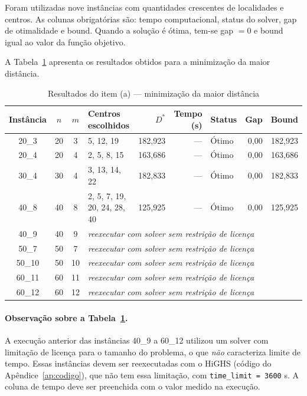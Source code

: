 \documentclass[12pt,a4paper]{article}
\begin{document}
Foram utilizadas nove instâncias com quantidades crescentes
de localidades e centros. As colunas obrigatórias são:
tempo computacional, status do solver, gap de otimalidade e
bound. Quando a solução é ótima, tem-se gap $=0$ e bound
igual ao valor da função objetivo.

A Tabela~\ref{tab:resultado_a} apresenta os resultados
obtidos para a minimização da maior distância.

\begin{table}[H]
\centering
\caption{Resultados do item (a) --- minimização da maior distância}
\label{tab:resultado_a}
\small
\begin{tabular}{c c c l r r l r r}
\toprule
Instância & $n$ & $m$ & Centros escolhidos & $D^*$ &
Tempo (s) & Status & Gap & Bound\\
\midrule
20\_3  & 20 & 3  & 5, 12, 19 & 182,923 & --- & Ótimo & 0,00 & 182,923\\
20\_4  & 20 & 4  & 2, 5, 8, 15 & 163,686 & --- & Ótimo & 0,00 & 163,686\\
30\_4  & 30 & 4  & 3, 13, 14, 22 & 182,833 & --- & Ótimo & 0,00 & 182,833\\
40\_8  & 40 & 8  & 2, 5, 7, 19, 20, 24, 28, 40 & 125,925 & --- & Ótimo & 0,00 & 125,925\\
40\_9  & 40 & 9  & \multicolumn{6}{l}{\textit{reexecutar com solver sem restrição de licença}}\\
50\_7  & 50 & 7  & \multicolumn{6}{l}{\textit{reexecutar com solver sem restrição de licença}}\\
50\_10 & 50 & 10 & \multicolumn{6}{l}{\textit{reexecutar com solver sem restrição de licença}}\\
60\_11 & 60 & 11 & \multicolumn{6}{l}{\textit{reexecutar com solver sem restrição de licença}}\\
60\_12 & 60 & 12 & \multicolumn{6}{l}{\textit{reexecutar com solver sem restrição de licença}}\\
\bottomrule
\end{tabular}
\end{table}

\paragraph{Observação sobre a Tabela~\ref{tab:resultado_a}.}
A execução anterior das instâncias 40\_9 a 60\_12 utilizou
um solver com limitação de licença para o tamanho do problema,
o que \emph{não} caracteriza limite de tempo. Essas
instâncias devem ser reexecutadas com o HiGHS (código do
Apêndice~\ref{ap:codigo}), que não tem essa limitação, com
\texttt{time\_limit = 3600} s. A coluna de tempo deve ser
preenchida com o valor medido na execução.
\end{document}
